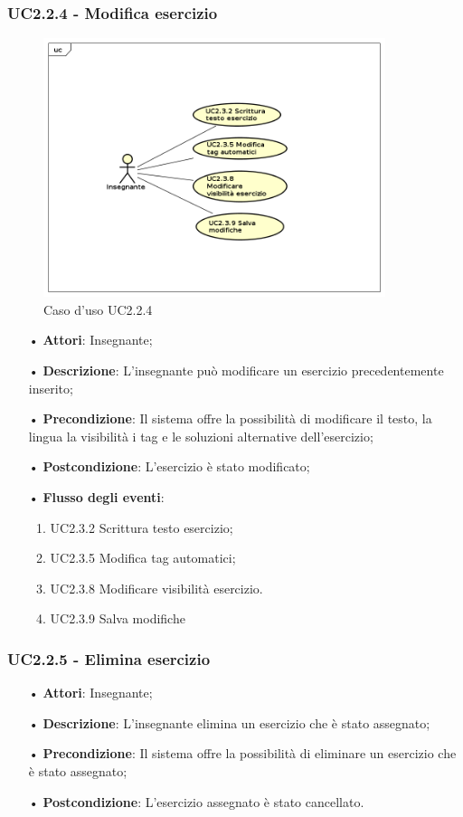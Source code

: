 \subsubsection{UC2.2.4 - Modifica esercizio}

\begin{figure}[H]
\centering
\includegraphics[width=10cm]{img/UC224.png} 
\caption{Caso d'uso UC2.2.4}
\end{figure}

\begin{itemize}
	\item[•] \textbf{Attori}: Insegnante;
	\item[•] \textbf{Descrizione}: L’insegnante può modificare un esercizio precedentemente inserito;
	\item[•] \textbf{Precondizione}: Il sistema offre la possibilità di modificare il testo, la
				lingua la visibilità i tag e le soluzioni alternative 
				dell’esercizio;
	\item[•] \textbf{Postcondizione}: L’esercizio è stato modificato;
	\item[•] \textbf{Flusso degli eventi}:
		\begin{enumerate}
			\item UC2.3.2 Scrittura testo esercizio;
			\item UC2.3.5 Modifica tag automatici;
			\item UC2.3.8 Modificare visibilità esercizio.
			\item UC2.3.9 Salva modifiche
		\end{enumerate}
		    
\end{itemize}   	
	
\subsubsection{UC2.2.5 - Elimina esercizio}
\begin{itemize}
	\item[•] \textbf{Attori}: Insegnante;
	\item[•] \textbf{Descrizione}: L’insegnante elimina un esercizio che è stato assegnato;
	\item[•] \textbf{Precondizione}: Il sistema offre la possibilità di eliminare un esercizio che è stato assegnato;
	\item[•] \textbf{Postcondizione}: L’esercizio assegnato è stato cancellato.
\end{itemize}


